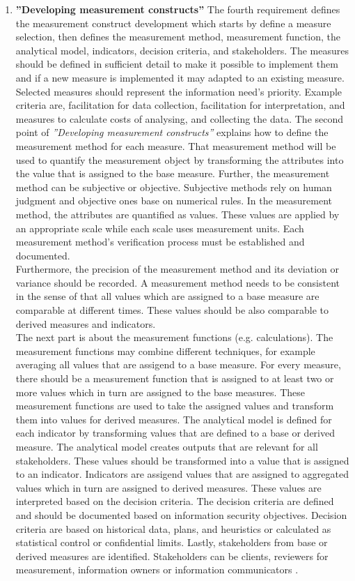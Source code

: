 \begin{enumerate}[label=(\alph*)]
  \item \label{itm:d} \textbf{''Developing measurement constructs''}
  The fourth requirement defines the measurement construct development which starts by define a measure selection, then defines the measurement method, measurement function, the analytical model, indicators, decision criteria, and stakeholders. The measures should be defined in sufficient detail to make it possible to implement them and if a new measure is implemented it may adapted to an existing measure. Selected measures should represent the information need's priority. Example criteria are, facilitation for data collection, facilitation for interpretation, and measures to calculate costs of analysing, and collecting the data. The second point of \textit{''Developing measurement constructs''} explains how to define the measurement method for each measure. That measurement method will be used to quantify the measurement object by transforming the attributes into the value that is assigned to the base measure. Further, the measurement method can be subjective or objective. Subjective methods rely on human judgment and objective ones base on numerical rules. In the measurement method, the attributes are quantified as values. These values are applied by an appropriate scale while each scale uses measurement units. Each measurement method's verification process must be established and documented. \\
  Furthermore, the precision of the measurement method and its deviation or variance should be recorded. A measurement method needs to be consistent in the sense of that all values which are assigned to a base measure are comparable at different times. These values should be also comparable to derived measures and indicators. \\
  The next part is about the measurement functions (e.g. calculations). The measurement functions may combine different techniques, for example averaging all values that are assigend to a base measure. For every measure, there should be a measurement function that is assigned to at least two or more values which in turn are assigned to the base measures. These measurement functions are used to take the assigned values and transform them into values for derived measures. The analytical model is defined for each indicator by transforming values that are defined to a base or derived measure. The analytical model creates outputs that are relevant for all stakeholders. These values should be transformed into a value that is assigned to an indicator. Indicators are assigend values that are assigned to aggregated values which in turn are assigned to derived measures. These values are interpreted based on the decision criteria. The decision criteria are defined and should be documented based on information security objectives. Decision criteria are based on historical data, plans, and heuristics or calculated as statistical control or confidential limits. Lastly, stakeholders from base or derived measures are identified. Stakeholders can be clients, reviewers for measurement, information owners or information communicators \cite{ISO_27004_2009}. \\


\end{enumerate}
